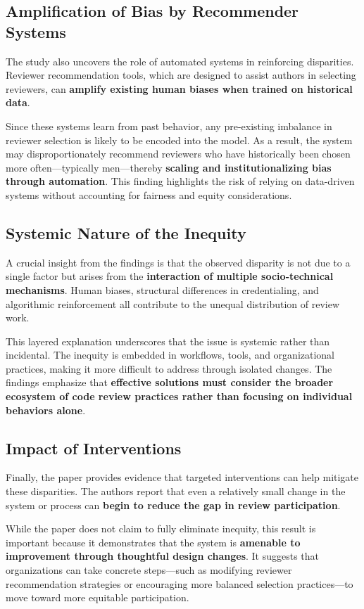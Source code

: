 \subsection{Amplification of Bias by Recommender Systems}
The study also uncovers the role of automated systems in reinforcing disparities. Reviewer recommendation tools, which are designed to assist authors in selecting reviewers, can \textbf{amplify existing human biases when trained on historical data}.

Since these systems learn from past behavior, any pre-existing imbalance in reviewer selection is likely to be encoded into the model. As a result, the system may disproportionately recommend reviewers who have historically been chosen more often—typically men—thereby \textbf{scaling and institutionalizing bias through automation}. This finding highlights the risk of relying on data-driven systems without accounting for fairness and equity considerations.

\subsection{Systemic Nature of the Inequity}
A crucial insight from the findings is that the observed disparity is not due to a single factor but arises from the \textbf{interaction of multiple socio-technical mechanisms}. Human biases, structural differences in credentialing, and algorithmic reinforcement all contribute to the unequal distribution of review work.

This layered explanation underscores that the issue is systemic rather than incidental. The inequity is embedded in workflows, tools, and organizational practices, making it more difficult to address through isolated changes. The findings emphasize that \textbf{effective solutions must consider the broader ecosystem of code review practices rather than focusing on individual behaviors alone}.

\subsection{Impact of Interventions}
Finally, the paper provides evidence that targeted interventions can help mitigate these disparities. The authors report that even a relatively small change in the system or process can \textbf{begin to reduce the gap in review participation}.

While the paper does not claim to fully eliminate inequity, this result is important because it demonstrates that the system is \textbf{amenable to improvement through thoughtful design changes}. It suggests that organizations can take concrete steps—such as modifying reviewer recommendation strategies or encouraging more balanced selection practices—to move toward more equitable participation.

